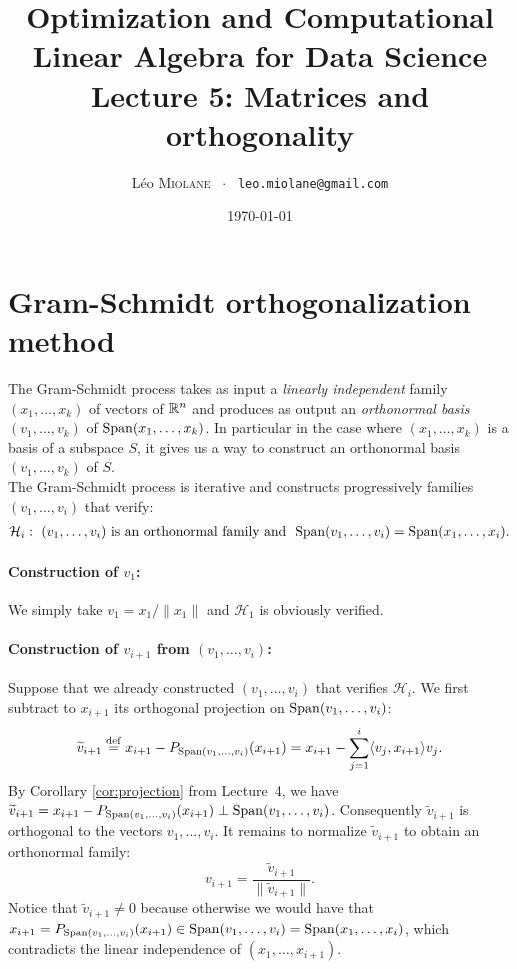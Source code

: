 \documentclass[11pt,nocut]{article}
\title{\vspace{-2.0cm}%
	Optimization and Computational Linear Algebra for Data Science\\
Lecture 5: Matrices and orthogonality}
\author{Léo \textsc{Miolane} \ $\cdot$ \ \texttt{leo.miolane@gmail.com}}
\date{\today}
\begin{document}
\maketitle


\section{Gram-Schmidt orthogonalization method}\label{sec:gram_schmidt}

The Gram-Schmidt process takes as input a \emph{linearly independent} family $(x_1, \dots, x_k)$ of vectors of $\mathbb{R}^n$ and produces as output an \emph{orthonormal basis} $(v_1, \dots, v_k)$ of ${{\rm Span}}(x_1, \dots, x_k)$.
In particular in the case where $(x_1, \dots, x_k)$ is a basis of a subspace $S$, it gives us a way to construct an orthonormal basis $(v_1, \dots ,v_k)$ of $S$.
\\

The Gram-Schmidt process is iterative and constructs progressively families $(v_1, \dots, v_i)$ that verify:
	\begin{align*}
		\mathcal{H}_i: \ (v_1, \dots, v_i) \ \text{is an orthonormal family and} \  \ {{\rm Span}}(v_1, \dots, v_i) = {{\rm Span}}(x_1, \dots, x_i).
\end{align*}

\paragraph{Construction of $v_1$:} We simply take $v_1 = x_1 / \|x_1\|$ and $\mathcal{H}_1$ is obviously verified.

\paragraph{Construction of $v_{i+1}$ from $(v_1, \dots, v_i)$:} 
Suppose that we already constructed $(v_1, \dots, v_i)$ that verifies $\mathcal{H}_i$.
We first subtract to $x_{i+1}$ its orthogonal projection on ${{\rm Span}}(v_1, \dots, v_i)$:
\begin{equation}\label{eq:gs1}
\widetilde{v}_{i+1} \overset{\rm def}{=} 
x_{i+1} - P_{{{\rm Span}}(v_1, \dots, v_i)}(x_{i+1}) =
x_{i+1} - \sum_{j=1}^i \langle v_j, x_{i+1} \rangle v_j.
\end{equation}
By Corollary \ref{cor:projection} from Lecture~4, we have $\widetilde{v}_{i+1} = x_{i+1} - P_{{{\rm Span}}(v_1, \dots, v_i)}(x_{i+1}) \perp {{\rm Span}}(v_1, \dots, v_i)$. Consequently $\widetilde{v}_{i+1}$ is orthogonal to the vectors $v_1, \dots, v_i$. 
It remains to normalize $\widetilde{v}_{i+1}$ to obtain an orthonormal family:
\begin{equation}\label{eq:gs2}
v_{i+1} = \frac{\widetilde{v}_{i+1}}{\| \widetilde{v}_{i+1} \|}.
\end{equation}
Notice that $\widetilde{v}_{i+1} \neq 0$ because otherwise we would have that $x_{i+1} = P_{{{\rm Span}}(v_1, \dots, v_i)}(x_{i+1}) \in {{\rm Span}}(v_1, \dots, v_i) = {{\rm Span}}(x_1, \dots, x_i)$, which contradicts the linear independence of $(x_1, \dots, x_{i+1})$.
\end{document}
